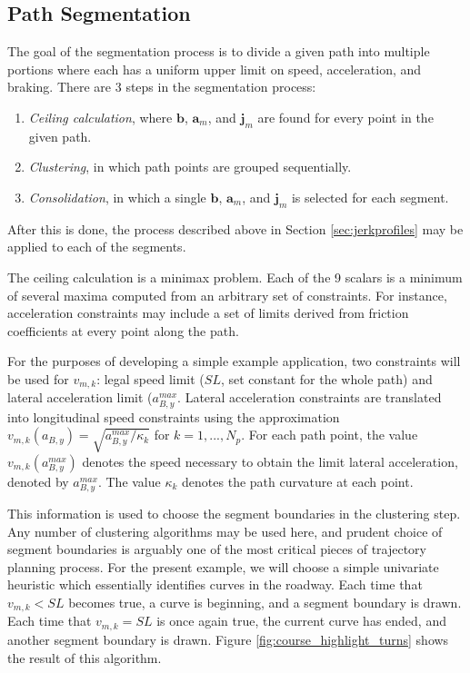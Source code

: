 \documentclass[letterpaper, 10 pt, conference]{ieeeconf}  %
\begin{document}

\subsection{Path Segmentation} \label{sec:pathsegmentation}

The goal of the segmentation process is to divide a given path into multiple portions where each has a uniform upper limit on speed, acceleration, and braking.
There are 3 steps in the segmentation process:
\begin{enumerate} \label{asdf}
  \item \emph{Ceiling calculation}, where $\mathbf{b}$, $\mathbf{a}_m$, and $\mathbf{j}_m$ are found for every point in the given path.
  \item \emph{Clustering}, in which path points are grouped sequentially.
  \item \emph{Consolidation}, in which a single $\mathbf{b}$, $\mathbf{a}_m$, and $\mathbf{j}_m$ is selected for each segment.
\end{enumerate}
After this is done, the process described above in Section \ref{sec:jerkprofiles} may be applied to each of the segments.

The ceiling calculation is a minimax problem.
Each of the 9 scalars is a minimum of several maxima computed from an arbitrary set of constraints.
For instance, acceleration constraints may include a set of limits derived from friction coefficients at every point along the path.

For the purposes of developing a simple example application, two constraints will be used for $v_{m,k}$: legal speed limit ($SL$, set constant for the whole path) and lateral acceleration limit ($a_{B,y}^{max}$. 
Lateral acceleration constraints are translated into longitudinal speed constraints using the approximation $v_{m,k}(a_{B,y}) = \sqrt{a_{B,y}^{max}/\kappa_k}$ for $k = 1, ..., N_p$.
For each path point, the value $v_{m,k}(a_{B,y}^{max})$ denotes the speed necessary to obtain the limit lateral acceleration, denoted by $a^{max}_{B,y}$.
The value $\kappa_k$ denotes the path curvature at each point.

This information is used to choose the segment boundaries in the clustering step.
Any number of clustering algorithms may be used here, and prudent choice of segment boundaries is arguably one of the most critical pieces of trajectory planning process.
For the present example, we will choose a simple univariate heuristic which essentially identifies curves in the roadway.
Each time that $v_{m,k} < SL$ becomes true, a curve is beginning, and a segment boundary is drawn.
Each time that $v_{m,k} = SL$ is once again true, the current curve has ended, and another segment boundary is drawn.
Figure \ref{fig:course_highlight_turns} shows the result of this algorithm. 
\end{document}
